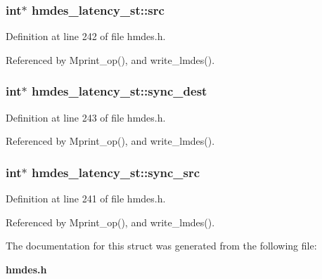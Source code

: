 \subsubsection{\setlength{\rightskip}{0pt plus 5cm}int$\ast$ \bf{hmdes\_\-latency\_\-st::src}}\label{structhmdes__latency__st_9c05bb42cc63d70a71d1668b1a8eadd5}




Definition at line 242 of file hmdes.h.

Referenced by Mprint\_\-op(), and write\_\-lmdes().
\subsubsection{\setlength{\rightskip}{0pt plus 5cm}int$\ast$ \bf{hmdes\_\-latency\_\-st::sync\_\-dest}}\label{structhmdes__latency__st_64e42361d990eaaf8d3b62e159b1ab1d}




Definition at line 243 of file hmdes.h.

Referenced by Mprint\_\-op(), and write\_\-lmdes().
\subsubsection{\setlength{\rightskip}{0pt plus 5cm}int$\ast$ \bf{hmdes\_\-latency\_\-st::sync\_\-src}}\label{structhmdes__latency__st_d183d41dc190f76ea87c630feb827e2c}




Definition at line 241 of file hmdes.h.

Referenced by Mprint\_\-op(), and write\_\-lmdes().

The documentation for this struct was generated from the following file:\begin{CompactItemize}
\item 
\bf{hmdes.h}\end{CompactItemize}
